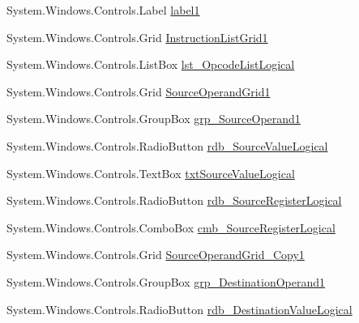 \begin{DoxyCompactItemize}
\item 
System.\+Windows.\+Controls.\+Label \hyperlink{class_c_p_u___o_s___simulator_1_1_instructions_window_a499640eb8a98693f1833dad30f5d8cb4}{label1}
\item 
System.\+Windows.\+Controls.\+Grid \hyperlink{class_c_p_u___o_s___simulator_1_1_instructions_window_a8f09b0005016c225169d7e9dd2724053}{Instruction\+List\+Grid1}
\item 
System.\+Windows.\+Controls.\+List\+Box \hyperlink{class_c_p_u___o_s___simulator_1_1_instructions_window_a61ee2cb0ba7197963b1138848778cd3c}{lst\+\_\+\+Opcode\+List\+Logical}
\item 
System.\+Windows.\+Controls.\+Grid \hyperlink{class_c_p_u___o_s___simulator_1_1_instructions_window_a3f9d1afc4455fa6b06c6fab3cdb6aeec}{Source\+Operand\+Grid1}
\item 
System.\+Windows.\+Controls.\+Group\+Box \hyperlink{class_c_p_u___o_s___simulator_1_1_instructions_window_a74e13776576d1a6ee5767e3fc8f6ec7f}{grp\+\_\+\+Source\+Operand1}
\item 
System.\+Windows.\+Controls.\+Radio\+Button \hyperlink{class_c_p_u___o_s___simulator_1_1_instructions_window_ad0e882b0d6d067460309ae6f1dda5d56}{rdb\+\_\+\+Source\+Value\+Logical}
\item 
System.\+Windows.\+Controls.\+Text\+Box \hyperlink{class_c_p_u___o_s___simulator_1_1_instructions_window_afac2309550dd6f1f1589dc7451e8f878}{txt\+Source\+Value\+Logical}
\item 
System.\+Windows.\+Controls.\+Radio\+Button \hyperlink{class_c_p_u___o_s___simulator_1_1_instructions_window_ab8c8622e8a96238fb88e455d60c51e78}{rdb\+\_\+\+Source\+Register\+Logical}
\item 
System.\+Windows.\+Controls.\+Combo\+Box \hyperlink{class_c_p_u___o_s___simulator_1_1_instructions_window_a46a9647a5a6e661afb789b1faa95a15a}{cmb\+\_\+\+Source\+Register\+Logical}
\item 
System.\+Windows.\+Controls.\+Grid \hyperlink{class_c_p_u___o_s___simulator_1_1_instructions_window_a685393ff28189e8c998e2a7dc6018b32}{Source\+Operand\+Grid\+\_\+\+Copy1}
\item 
System.\+Windows.\+Controls.\+Group\+Box \hyperlink{class_c_p_u___o_s___simulator_1_1_instructions_window_ab89f01ff39ce6f5ed461fcf5242be3a5}{grp\+\_\+\+Destination\+Operand1}
\item 
System.\+Windows.\+Controls.\+Radio\+Button \hyperlink{class_c_p_u___o_s___simulator_1_1_instructions_window_a73ba820a305842d3dea1ad79e6e87e6d}{rdb\+\_\+\+Destination\+Value\+Logical}

\end{DoxyCompactItemize}
